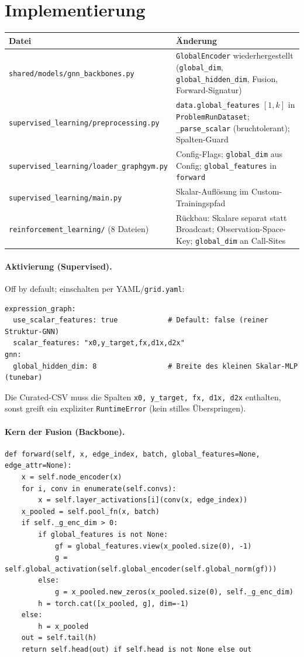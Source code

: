 \documentclass[11pt,a4paper]{article}
\newcommand{\code}[1]{\texttt{#1}}
\begin{document}
\section{Implementierung}

\begin{center}\small
\begin{tabular}{@{}p{6.4cm}p{8.0cm}@{}}
\toprule
\textbf{Datei} & \textbf{Änderung} \\
\midrule
\code{shared/models/gnn\_backbones.py} & \code{GlobalEncoder} wiederhergestellt
(\code{global\_dim}, \code{global\_hidden\_dim}, Fusion, Forward-Signatur) \\
\code{supervised\_learning/preprocessing.py} & \code{data.global\_features} $[1,k]$ in
\code{ProblemRunDataset}; \code{\_parse\_scalar} (bruchtolerant); Spalten-Guard \\
\code{supervised\_learning/loader\_graphgym.py} & Config-Flags; \code{global\_dim} aus
Config; \code{global\_features} in \code{forward} \\
\code{supervised\_learning/main.py} & Skalar-Auflösung im Custom-Trainingspfad \\
\code{reinforcement\_learning/} (8 Dateien) & Rückbau: Skalare separat statt Broadcast;
Observation-Space-Key; \code{global\_dim} an Call-Sites \\
\bottomrule
\end{tabular}
\end{center}

\paragraph{Aktivierung (Supervised).} Off by default; einschalten per YAML/\code{grid.yaml}:
\begin{lstlisting}[style=py]
expression_graph:
  use_scalar_features: true            # Default: false (reiner Struktur-GNN)
  scalar_features: "x0,y_target,fx,d1x,d2x"
gnn:
  global_hidden_dim: 8                 # Breite des kleinen Skalar-MLP (tunebar)
\end{lstlisting}
Die Curated-CSV muss die Spalten \code{x0, y\_target, fx, d1x, d2x} enthalten, sonst
greift ein expliziter \code{RuntimeError} (kein stilles Überspringen).

\paragraph{Kern der Fusion (Backbone).}
\begin{lstlisting}[style=py]
def forward(self, x, edge_index, batch, global_features=None, edge_attr=None):
    x = self.node_encoder(x)
    for i, conv in enumerate(self.convs):
        x = self.layer_activations[i](conv(x, edge_index))
    x_pooled = self.pool_fn(x, batch)
    if self._g_enc_dim > 0:
        if global_features is not None:
            gf = global_features.view(x_pooled.size(0), -1)
            g = self.global_activation(self.global_encoder(self.global_norm(gf)))
        else:
            g = x_pooled.new_zeros(x_pooled.size(0), self._g_enc_dim)
        h = torch.cat([x_pooled, g], dim=-1)
    else:
        h = x_pooled
    out = self.tail(h)
    return self.head(out) if self.head is not None else out
\end{lstlisting}
\end{document}

